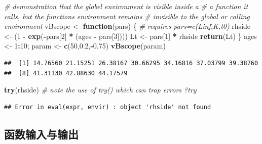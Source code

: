 \documentclass[
  lang=cn,
  11pt,
  scheme=chinese,
  chinesefont=nofont,
  citestyle=gb7714-2015,
  bibstyle=gb7714-2015]{elegantbook}
\newenvironment{Shaded}{\begin{snugshade}}{\end{snugshade}}
\newcommand{\CommentTok}[1]{\textcolor[rgb]{0.56,0.35,0.01}{\textit{#1}}}
\newcommand{\ControlFlowTok}[1]{\textcolor[rgb]{0.13,0.29,0.53}{\textbf{#1}}}
\newcommand{\DecValTok}[1]{\textcolor[rgb]{0.00,0.00,0.81}{#1}}
\newcommand{\FloatTok}[1]{\textcolor[rgb]{0.00,0.00,0.81}{#1}}
\newcommand{\FunctionTok}[1]{\textcolor[rgb]{0.13,0.29,0.53}{\textbf{#1}}}
\newcommand{\NormalTok}[1]{#1}
\newcommand{\OtherTok}[1]{\textcolor[rgb]{0.56,0.35,0.01}{#1}}
\newcommand{\SpecialCharTok}[1]{\textcolor[rgb]{0.81,0.36,0.00}{\textbf{#1}}}
\begin{document}
\begin{Shaded}
\begin{Highlighting}[]
 \CommentTok{\# demonstration that the globel environment is \textquotesingle{}visible\textquotesingle{} inside a  }
 \CommentTok{\# a function it calls, but the function\textquotesingle{}s environment remains  }
 \CommentTok{\# invisible to the global or calling environment  }
\NormalTok{vBscope }\OtherTok{\textless{}{-}} \ControlFlowTok{function}\NormalTok{(pars) \{ }\CommentTok{\# requires pars=c(Linf,K,t0)  }
\NormalTok{  rhside }\OtherTok{\textless{}{-}}\NormalTok{ (}\DecValTok{1} \SpecialCharTok{{-}} \FunctionTok{exp}\NormalTok{(}\SpecialCharTok{{-}}\NormalTok{pars[}\DecValTok{2}\NormalTok{] }\SpecialCharTok{*}\NormalTok{ (ages }\SpecialCharTok{{-}}\NormalTok{ pars[}\DecValTok{3}\NormalTok{])))  }
\NormalTok{  Lt }\OtherTok{\textless{}{-}}\NormalTok{ pars[}\DecValTok{1}\NormalTok{] }\SpecialCharTok{*}\NormalTok{ rhside  }
  \FunctionTok{return}\NormalTok{(Lt)  }
\NormalTok{\}  }
\NormalTok{ages }\OtherTok{\textless{}{-}} \DecValTok{1}\SpecialCharTok{:}\DecValTok{10}\NormalTok{; param }\OtherTok{\textless{}{-}} \FunctionTok{c}\NormalTok{(}\DecValTok{50}\NormalTok{,}\FloatTok{0.2}\NormalTok{,}\SpecialCharTok{{-}}\FloatTok{0.75}\NormalTok{)  }
\FunctionTok{vBscope}\NormalTok{(param)  }
\end{Highlighting}
\end{Shaded}

\begin{verbatim}
##  [1] 14.76560 21.15251 26.38167 30.66295 34.16816 37.03799 39.38760
##  [8] 41.31130 42.88630 44.17579
\end{verbatim}

\begin{Shaded}
\begin{Highlighting}[]
\FunctionTok{try}\NormalTok{(rhside)    }\CommentTok{\# note the use of try() which can trap errors ?try  }
\end{Highlighting}
\end{Shaded}

\begin{verbatim}
## Error in eval(expr, envir) : object 'rhside' not found
\end{verbatim}

\subsection{函数输入与输出}\label{ux51fdux6570ux8f93ux5165ux4e0eux8f93ux51fa}
\end{document}
